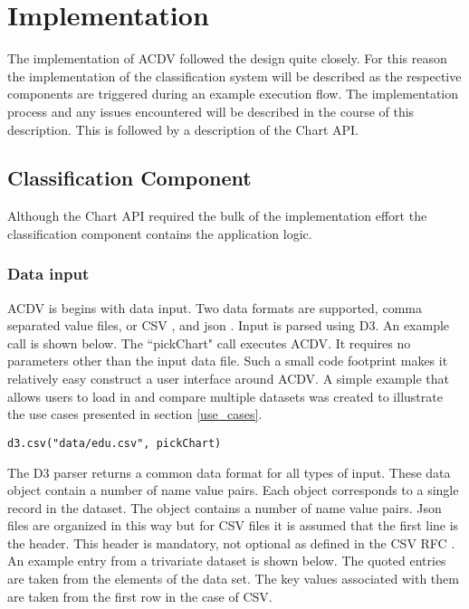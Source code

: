 \documentclass[a4paper, 11pt, titlepage, onehalfspacing]{report}
\begin{document}
\chapter{Implementation}

The implementation of AC\lightning{}DV followed the design quite closely. For this reason the implementation of the classification system will be described as the respective components are triggered during an example execution flow. The implementation process and any issues encountered will be described in the course of this description. This is followed by a description of the Chart API.

\section{Classification Component}
Although the Chart API required the bulk of the implementation effort the classification component contains the application logic.

\subsection{Data input}
AC\lightning{}DV is begins with data input. Two data formats are supported, comma separated value files, or CSV \cite{csv}, and json \cite{json}. Input is parsed using D3. An example call is shown below. The ``pickChart" call executes AC\lightning{}DV. It requires no parameters other than the input data file. Such a small code footprint makes it relatively easy construct a user interface around AC\lightning{}DV. A simple example that allows users to load in and compare multiple datasets was created to illustrate the use cases presented in section \ref{use_cases}. 

\begin{verbatim}
d3.csv("data/edu.csv", pickChart)
\end{verbatim}

The D3 parser returns a common data format for all types of input. These data object contain a number of name value pairs. Each object corresponds to a single record in the dataset. The object contains a number of name value pairs. Json files are organized in this way but for CSV files it is assumed that the first line is the header. This header is mandatory, not optional as defined in the CSV RFC \cite{csv}. An example entry from a trivariate dataset is shown below. The quoted entries are taken from the elements of the data set. The key values associated with them are taken from the first row in the case of CSV.
\end{document}
